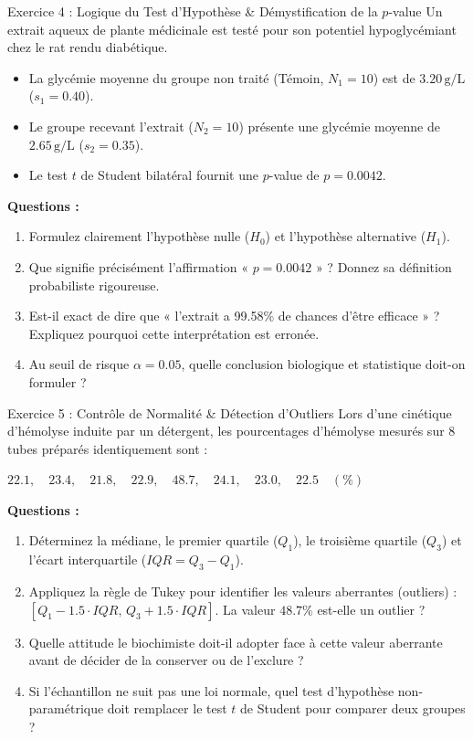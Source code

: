 \documentclass[11pt,a4paper]{article}
\begin{document}
\begin{exercicebox}{Exercice 4 : Logique du Test d'Hypothèse \& Démystification de la $p$-value}
Un extrait aqueux de plante médicinale est testé pour son potentiel hypoglycémiant chez le rat rendu diabétique.
\begin{itemize}
  \item La glycémie moyenne du groupe non traité (Témoin, $N_1 = 10$) est de $3.20\,\text{g/L}$ ($s_1 = 0.40$).
  \item Le groupe recevant l'extrait ($N_2 = 10$) présente une glycémie moyenne de $2.65\,\text{g/L}$ ($s_2 = 0.35$).
  \item Le test $t$ de Student bilatéral fournit une $p$-value de $p = 0.0042$.
\end{itemize}

\textbf{Questions :}
\begin{enumerate}[label=\textbf{\alph*.}]
  \item Formulez clairement l'hypothèse nulle ($H_0$) et l'hypothèse alternative ($H_1$).
  \item Que signifie précisément l'affirmation « $p = 0.0042$ » ? Donnez sa définition probabiliste rigoureuse.
  \item Est-il exact de dire que « l'extrait a 99.58\% de chances d'être efficace » ? Expliquez pourquoi cette interprétation est erronée.
  \item Au seuil de risque $\alpha = 0.05$, quelle conclusion biologique et statistique doit-on formuler ?
\end{enumerate}
\end{exercicebox}

\begin{exercicebox}{Exercice 5 : Contrôle de Normalité \& Détection d'Outliers}
Lors d'une cinétique d'hémolyse induite par un détergent, les pourcentages d'hémolyse mesurés sur 8 tubes préparés identiquement sont :
\begin{center}
  $22.1, \quad 23.4, \quad 21.8, \quad 22.9, \quad 48.7, \quad 24.1, \quad 23.0, \quad 22.5 \quad (\%)$
\end{center}

\textbf{Questions :}
\begin{enumerate}[label=\textbf{\alph*.}]
  \item Déterminez la médiane, le premier quartile ($Q_1$), le troisième quartile ($Q_3$) et l'écart interquartile ($IQR = Q_3 - Q_1$).
  \item Appliquez la règle de Tukey pour identifier les valeurs aberrantes (outliers) : $[Q_1 - 1.5 \cdot IQR, \, Q_3 + 1.5 \cdot IQR]$. La valeur $48.7\%$ est-elle un outlier ?
  \item Quelle attitude le biochimiste doit-il adopter face à cette valeur aberrante avant de décider de la conserver ou de l'exclure ?
  \item Si l'échantillon ne suit pas une loi normale, quel test d'hypothèse non-paramétrique doit remplacer le test $t$ de Student pour comparer deux groupes ?
\end{enumerate}
\end{exercicebox}
\end{document}
